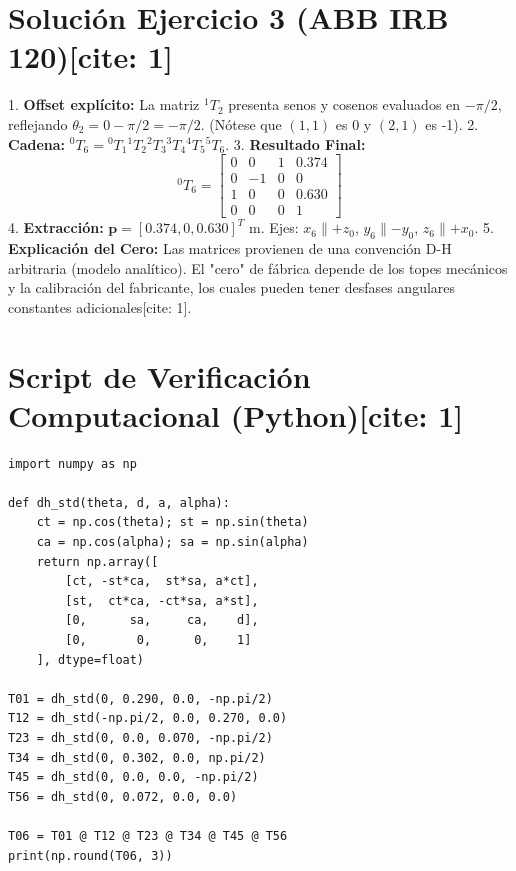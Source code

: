 \documentclass[11pt, a4paper]{article}
\begin{document}
\section*{Solución Ejercicio 3 (ABB IRB 120)[cite: 1]}
1. \textbf{Offset explícito:} La matriz ${}^{1}T_2$ presenta senos y cosenos evaluados en $-\pi/2$, reflejando $\theta_2 = 0 - \pi/2 = -\pi/2$. (Nótese que $(1,1)$ es 0 y $(2,1)$ es -1).
2. \textbf{Cadena:} ${}^{0}T_6 = {}^{0}T_1 {}^{1}T_2 {}^{2}T_3 {}^{3}T_4 {}^{4}T_5 {}^{5}T_6$.
3. \textbf{Resultado Final:}
\begin{equation*}
    {}^{0}T_6 = \begin{bmatrix}
    0 & 0 & 1 & 0.374 \\
    0 & -1 & 0 & 0 \\
    1 & 0 & 0 & 0.630 \\
    0 & 0 & 0 & 1
    \end{bmatrix}
\end{equation*}
4. \textbf{Extracción:} $\mathbf{p} = [0.374, 0, 0.630]^T\text{ m}$. Ejes: $x_6 \parallel +z_0$, $y_6 \parallel -y_0$, $z_6 \parallel +x_0$.
5. \textbf{Explicación del Cero:} Las matrices provienen de una convención D-H arbitraria (modelo analítico). El "cero" de fábrica depende de los topes mecánicos y la calibración del fabricante, los cuales pueden tener desfases angulares constantes adicionales[cite: 1].

\section*{Script de Verificación Computacional (Python)[cite: 1]}
\begin{lstlisting}
import numpy as np

def dh_std(theta, d, a, alpha):
    ct = np.cos(theta); st = np.sin(theta)
    ca = np.cos(alpha); sa = np.sin(alpha)
    return np.array([
        [ct, -st*ca,  st*sa, a*ct],
        [st,  ct*ca, -ct*sa, a*st],
        [0,      sa,     ca,    d],
        [0,       0,      0,    1]
    ], dtype=float)

T01 = dh_std(0, 0.290, 0.0, -np.pi/2)
T12 = dh_std(-np.pi/2, 0.0, 0.270, 0.0)
T23 = dh_std(0, 0.0, 0.070, -np.pi/2)
T34 = dh_std(0, 0.302, 0.0, np.pi/2)
T45 = dh_std(0, 0.0, 0.0, -np.pi/2)
T56 = dh_std(0, 0.072, 0.0, 0.0)

T06 = T01 @ T12 @ T23 @ T34 @ T45 @ T56
print(np.round(T06, 3))
\end{lstlisting}
\end{document}
